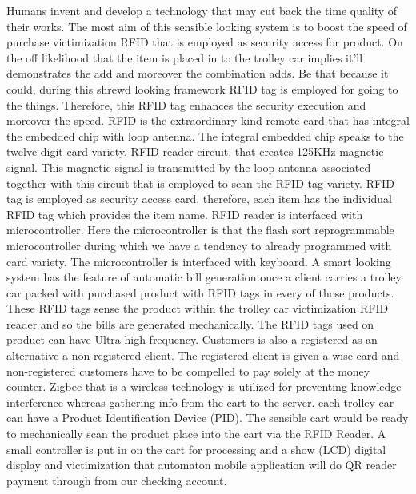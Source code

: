 \documentclass[12pt]{article}
\begin{document}
\hspace*{1cm}Humans invent and develop a technology that may cut back the time quality of their works. The most aim of this sensible looking system is to boost the speed of purchase victimization RFID that is employed as security access for product. On the off likelihood that the item is placed in to the trolley car implies it'll demonstrates the add and moreover the combination adds. Be that because it could, during this shrewd looking framework RFID tag is employed for going to the things. Therefore, this RFID tag enhances the security execution and moreover the speed. RFID is the extraordinary kind remote card that has integral the embedded chip with loop antenna. The integral embedded chip speaks to the twelve-digit card variety. RFID reader circuit, that creates 125KH{z} magnetic signal. This magnetic signal is transmitted by the loop antenna associated together with this circuit that is employed to scan the RFID tag variety. RFID tag is employed as security access card. therefore, each item has the individual RFID tag which provides the item name. RFID reader is interfaced with microcontroller. Here the microcontroller is that the flash sort reprogrammable microcontroller during which we have a tendency to already programmed with card variety. The microcontroller is interfaced with keyboard. A smart looking system has the feature of automatic bill generation once a client carries a trolley car packed with purchased product with RFID tags in every of those products. These RFID tags sense the product within the trolley car victimization RFID reader and so the bills are generated mechanically. The RFID tags used on product can have Ultra-high frequency. Customers is also a registered as an alternative a non-registered client. The registered client is given a wise card and non-registered customers have to be compelled to pay solely at the money counter. Zigbee that is a wireless technology is utilized for preventing knowledge interference whereas gathering info from the cart to the server. each trolley car can have a Product Identification Device (PID). The sensible cart would be ready to mechanically scan the product place into the cart via the RFID Reader. A small controller is put in on the cart for processing and a show (LCD) digital display and victimization that automaton mobile application will do QR reader payment through from our checking account.
\end{document}
